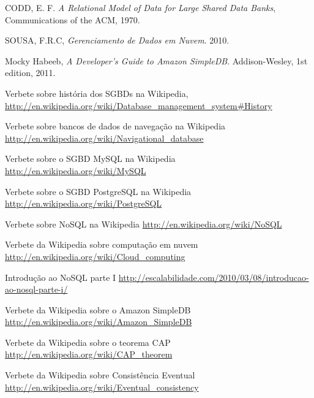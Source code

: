 \begin{thebibliography}{9}
  CODD, E. F.
  \emph{A Relational Model of Data for Large Shared Data Banks},
  Communications of the ACM,
  1970.
  
  SOUSA, F.R.C,
  \emph{Gerenciamento de Dados em Nuvem}.
  2010.
  
  Mocky Habeeb,
  \emph{A Developer's Guide to Amazon SimpleDB}.
  Addison-Wesley,
  1st edition,
  2011.
  
  Verbete sobre história dos SGBDs na Wikipedia,
  \url{http://en.wikipedia.org/wiki/Database_management_system#History}
  
  Verbete sobre bancos de dados de navegação na Wikipedia
  \url{http://en.wikipedia.org/wiki/Navigational_database}
  
  Verbete sobre o SGBD MySQL na Wikipedia
  \url{http://en.wikipedia.org/wiki/MySQL}
  
  Verbete sobre o SGBD PostgreSQL na Wikipedia
  \url{http://en.wikipedia.org/wiki/PostgreSQL}
  
  Verbete sobre NoSQL na Wikipedia
  \url{http://en.wikipedia.org/wiki/NoSQL}
  
  Verbete da Wikipedia sobre computação em nuvem
  \url{http://en.wikipedia.org/wiki/Cloud_computing}  
  
  Introdução ao NoSQL parte I
  \url{http://escalabilidade.com/2010/03/08/introducao-ao-nosql-parte-i/}
  
  Verbete da Wikipedia sobre o Amazon SimpleDB
  \url{http://en.wikipedia.org/wiki/Amazon_SimpleDB}
  
  Verbete da Wikipedia sobre o teorema CAP
  \url{http://en.wikipedia.org/wiki/CAP_theorem}
  
  Verbete da Wikipedia sobre Consistência Eventual
  \url{http://en.wikipedia.org/wiki/Eventual_consistency}
\end{thebibliography}